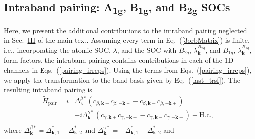 \documentclass[%
reprint,
superscriptaddress,
 amsmath,amssymb,
 aps,
prb,
nobalancelastpage,
]{revtex4-2}
\begin{document}
\subsection{Intraband pairing: \texorpdfstring{A\textsubscript{1g}}{A1g}, \texorpdfstring{B\textsubscript{1g}}{B1g}, and \texorpdfstring{B\textsubscript{2g}}{B2g} SOCs}

Here, we present the additional contributions to the intraband pairing neglected in Sec.~\hyperref[Three]{III} of the main text. Assuming every term in Eq.~(\ref{3orbMatrix}) is finite, i.e., incorporating the atomic SOC, $\lambda$, and the SOC with $B_{2g}$, $\lambda_{\textbf{k}}^{B_{2g}}$, and $B_{1g}$, $\lambda_{\textbf{k}}^{B_{1g}}$, form factors, the intraband pairing contains contributions in each of the 1D channels in Eqs.~(\ref{pairing_irreps}). Using the terms from Eqs.~(\ref{pairing_irreps}), we apply the transformation to the band basis given by Eq.~(\ref{last_trsf}). The resulting intraband pairing is
\begin{equation}
\begin{aligned}
    \widetilde{H}_{\text{pair}} = i&\Delta_{\textbf{k}}^{\beta*}(c_{\beta,\textbf{k}+}c_{\beta,-\textbf{k}-} -c_{\beta,\textbf{k}-}c_{\beta,-\textbf{k}+}) \\[6pt]&+i \Delta_{\textbf{k}}^{\gamma*} (c_{\gamma,\textbf{k}+}c_{\gamma,-\textbf{k}-} -c_{\gamma,\textbf{k}-}c_{\gamma,-\textbf{k}+}) + \text{H.c.},\\[6pt]
\end{aligned}
\end{equation}
where $\displaystyle \Delta_{\textbf{k}}^{\beta*} = \Delta_{\textbf{k},1}^{*} + \Delta_{\textbf{k},2}^{*}$ and $\displaystyle \Delta_{\textbf{k}}^{\gamma*} = -\Delta_{\textbf{k},1}^{*} + \Delta_{\textbf{k},2}^{*}$ and
\end{document}

